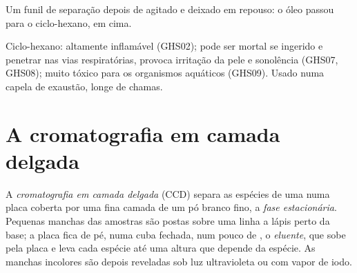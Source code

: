 \begin{omfigure}

{\small Um funil de separação depois de agitado e deixado em repouso: o
óleo passou para o ciclo-hexano, em cima.}
\end{omfigure}

\begin{safety}{}
Ciclo-hexano: altamente inflamável (GHS02); pode ser mortal se ingerido
e penetrar nas vias respiratórias, provoca irritação da pele e
sonolência (GHS07, GHS08); muito tóxico para os organismos aquáticos
(GHS09). Usado numa capela de exaustão, longe de chamas.
\end{safety}

\section{A cromatografia em camada delgada}

\begin{definition}\label{def:g10:chemical-species:tlc}
A \emph{cromatografia em camada delgada}
(CCD) separa as espécies de uma  numa placa coberta por uma fina
camada de um pó branco fino, a \emph{fase estacionária}.
Pequenas manchas das amostras são postas sobre uma linha
a lápis perto da base; a placa fica de pé, numa cuba fechada, num pouco
de , o \emph{eluente}, que sobe pela placa e leva
cada espécie até uma altura que depende da espécie. As manchas incolores
são depois reveladas sob luz ultravioleta ou com vapor de iodo.
\end{definition}


